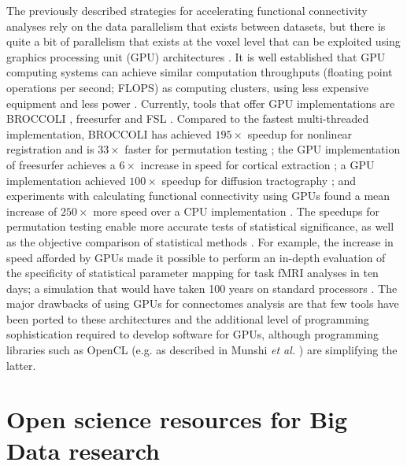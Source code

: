 \documentclass{bmcart}
\begin{document}
The previously described strategies for accelerating functional connectivity analyses rely on the data parallelism that exists between datasets, but there is quite a bit of parallelism that exists at the voxel level that can be exploited using graphics processing unit (GPU) architectures \cite{Eklund2012a}. It is well established that GPU computing systems can achieve similar computation throughputs (floating point operations per second; FLOPS) as computing clusters, using less expensive equipment and less power \cite{Eklund2012a,Hernandez2013}. Currently, tools that offer GPU implementations are BROCCOLI \cite{eklund2014broccoli}, freesurfer \cite{delgado2014} and FSL \cite{Hernandez2013dti}. Compared to the fastest multi-threaded implementation, BROCCOLI has achieved $195\times$ speedup for nonlinear registration and is $33\times$ faster for permutation testing \cite{Eklund2013}; the GPU implementation of freesurfer achieves a $6\times$ increase in speed for cortical extraction \cite{delgado2014}; a GPU implementation achieved $100 \times$ speedup for diffusion tractography \cite{Hernandez2013dti}; and experiments with calculating functional connectivity using GPUs found a mean increase of $250\times$ more speed over a CPU implementation \cite{Eklund2011b}. The speedups for permutation testing enable more accurate tests of statistical significance, as well as the objective comparison of statistical methods \cite{Eklund2011}. For example, the increase in speed afforded by GPUs made it possible to perform an in-depth evaluation of the specificity of statistical parameter mapping for task fMRI analyses in ten days; a simulation that would have taken 100 years on standard processors \cite{Eklund2012}.  The major drawbacks of using GPUs for connectomes analysis are that few tools have been ported to these architectures and the additional level of programming sophistication required to develop software for GPUs, although programming libraries such as OpenCL (e.g. as described in Munshi \emph{et al.} \cite{Munshi2011}) are simplifying the latter.

\section{Open science resources for Big Data research}
\end{document}
